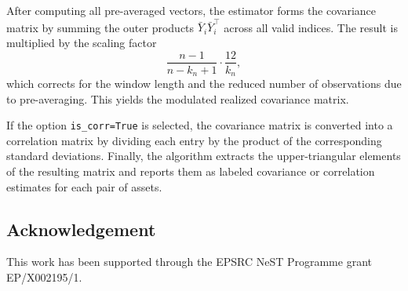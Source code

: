 \documentclass[12pt]{amsart}
\numberwithin{equation}{section}
\newcommand{\1}{\mathbf{1}}
\begin{document}
After computing all pre-averaged vectors, the estimator forms the covariance matrix by summing the outer products $\bar{Y}_i \bar{Y}_i^\top$ across all valid indices. The result is multiplied by the scaling factor
\[
\frac{n-1}{n-k_n+1} \cdot \frac{12}{k_n},
\]
which corrects for the window length and the reduced number of observations due to pre-averaging. This yields the modulated realized covariance matrix.

If the option \texttt{is\_corr=True} is selected, the covariance matrix is converted into a correlation matrix by dividing each entry by the product of the corresponding standard deviations. Finally, the algorithm extracts the upper-triangular elements of the resulting matrix and reports them as labeled covariance or correlation estimates for each pair of assets.

\subsection*{Acknowledgement}
This work has been supported through the 
EPSRC NeST Programme grant EP/X002195/1.



\end{document}

